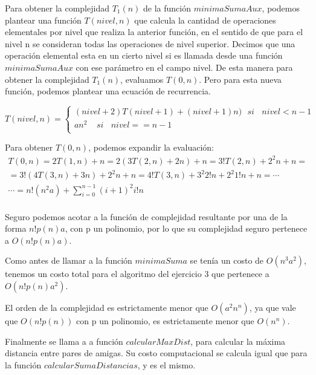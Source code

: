 Para obtener la complejidad $ T_1(n) $ de la función $ minimaSumaAux $, podemos plantear una función $ T(nivel,n) $ que calcula la cantidad de operaciones elementales por nivel que realiza la anterior función, en el sentido de que para el nivel n se consideran todas las operaciones de nivel superior. Decimos que una operación elemental esta en un cierto nivel si es llamada desde una función $ minimaSumaAux $ con ese parámetro en el campo nivel. De esta manera para obtener la complejidad $ T_1(n) $, evaluamos $T(0,n)$. Pero para esta nueva función, podemos plantear una ecuación de recurrencia.

\begin{equation*}
T(nivel,n) = \left\lbrace
\begin{array}{c}
 (nivel+2)T(nivel+1)+(nivel+1)n) \ \ \ si \ \ \ \  nivel< n-1 \\
  an^2  \  \ \ \  \ si \ \ \ \  nivel==n-1 \\
\end{array}
\right.
\end{equation*}

Para obtener  $T(0,n)$, podemos expandir la evaluación:
\begin{equation*}
\begin{array}{c}
 T(0,n)=2T(1,n)+n=2(3T(2,n)+2n)+n=3!T(2,n)+2^{2}n+n= \\
  = 3!(4T(3,n)+3n)+2^{2}n+n=4!T(3,n)+3^{2}2!n+2^{2}1!n+n=\cdots\\
 \cdots = n!(n^2a) + \sum_{i=0}^{n-1} (i+1)^{2}i! n  \\
\end{array}
\end{equation*}

Seguro podemos acotar a la función de complejidad resultante por una de la forma $ n!p(n)a $, con p un polinomio, por lo que su complejidad seguro pertenece a $O(n!p(n)a)$.

Como antes de llamar a la función $ minimaSuma $ se tenía un costo de $ O(n^{3}a^{2})$, tenemos un costo total para el algoritmo del ejercicio 3 que pertenece a $ O(n!p(n)a^2)$.

El orden de la complejidad es estrictamente menor que $ O(a^2n^n)$, ya que vale que $ O(n!p(n)) $ con p un polinomio, es estrictamente menor que $ O(n^n) $.

Finalmente se llama a a función $calcularMaxDist$, para calcular la máxima distancia entre pares de amigas. Su costo computacional se calcula igual que para la función $calcularSumaDistancias$, y es el mismo.

